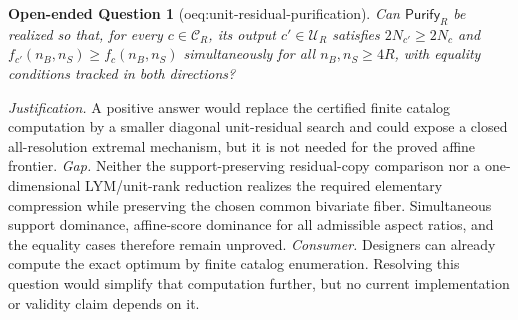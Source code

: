 \documentclass{article}
\newtheorem{openendedquestion}{Open-ended Question}
\begin{document}
\begin{openendedquestion}[oeq:unit-residual-purification]\label{oeq:unit-residual-purification}
Can \(\mathsf{Purify}_R\) be realized so that, for every \(c\in\mathcal C_R\), its output \(c'\in\mathcal U_R\) satisfies \(2N_{c'}\ge2N_c\) and \(f_{c'}(n_B,n_S)\ge f_c(n_B,n_S)\) simultaneously for all \(n_B,n_S\ge4R\), with equality conditions tracked in both directions?
\end{openendedquestion}
\par\smallskip\noindent \textit{Justification.} A positive answer would replace the certified finite catalog computation by a smaller diagonal unit-residual search and could expose a closed all-resolution extremal mechanism, but it is not needed for the proved affine frontier. \textit{Gap.} Neither the support-preserving residual-copy comparison nor a one-dimensional LYM/unit-rank reduction realizes the required elementary compression while preserving the chosen common bivariate fiber. Simultaneous support dominance, affine-score dominance for all admissible aspect ratios, and the equality cases therefore remain unproved. \textit{Consumer.} Designers can already compute the exact optimum by finite catalog enumeration. Resolving this question would simplify that computation further, but no current implementation or validity claim depends on it.
\end{document}
